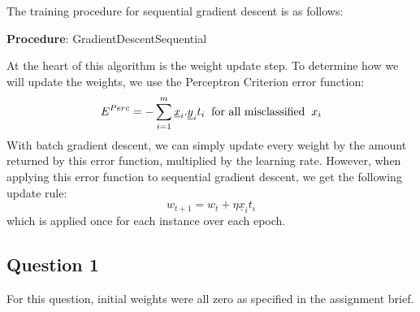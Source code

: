 \documentclass{article}
\begin{document}
The training procedure for sequential gradient descent is as follows: \\

\begin{algorithm}[H]{\textbf{Procedure}: GradientDescentSequential} \\
    \SetAlgoLined
\end{algorithm}
\vspace{4mm}

\noindent At the heart of this algorithm is the weight update step. To determine how we will update the weights, we use the Perceptron Criterion error function:
\[E^{Perc} = -\sum_{i = 1}^{m} \underline{x}_{i} . \underline{y}_{i} t_{i} \hspace{2mm} \textrm{for all misclassified} \hspace{2mm} x_{i}\]
With batch gradient descent, we can simply update every weight by the amount returned by this error function, multiplied by the learning rate. However, when applying this error function to sequential gradient descent, we get the following update rule:
\[w_{t+1} = w_{t} + \eta \underline{x}_{i} t_{i}\]
which is applied once for each instance over each epoch.
\subsection*{Question 1}
\indent For this question, initial weights were all zero as specified in the assignment brief.
\end{document}

